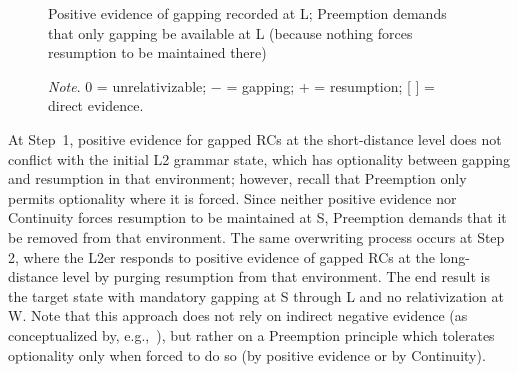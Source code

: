 \begin{figure}
\begin{mybox}
Positive evidence of gapping recorded at L; Preemption demands that only gapping be available at L (because nothing forces resumption to be maintained there) 
\par\vspace{6pt}
\vspace{-6pt} 
\end{mybox}
\vspace{-6pt} 
\textit{Note}. 0 = unrelativizable; − = gapping; + = resumption; [ ] = direct evidence.\par
{}\vspace{-12pt}
\end{figure}

\noindent At Step~1, positive evidence for gapped RCs at the short-distance level does not conflict with the initial L2 grammar state, which has optionality between gapping and resumption in that environment; however, recall that Preemption only permits optionality where it is forced. Since neither positive evidence nor Continuity forces resumption to be maintained at S, Preemption demands that it be removed from that environment. The same overwriting process occurs at Step 2, where the L2er responds to positive evidence of gapped RCs at the long-distance level by purging resumption from that environment. The end result is the target state with mandatory gapping at S through L and no relativization at W. Note that this approach does not rely on indirect negative evidence (as conceptualized by, e.g.,~\cite{plough1994}), but rather on a Preemption principle which tolerates optionality only when forced to do so (by positive evidence or by Continuity). 


